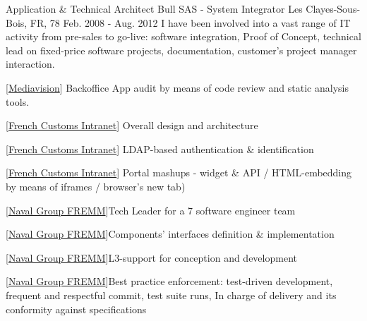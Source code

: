 \begin{cventries}
  \cventry
    {Application \& Technical Architect} %
    {Bull SAS - System Integrator} %
    {Les Clayes-Sous-Bois, FR, 78} %
    {Feb. 2008 - Aug. 2012} %
{
I have been involved into a vast range of IT activity from pre-sales to go-live: software integration, Proof of Concept, technical lead on fixed-price software projects, documentation, customer’s project manager interaction.
} %
{
      \begin{cvitems} %
        \item {[\href{http://www.mediavision.fr}{Mediavision}] Backoffice App audit by means of code review and static analysis tools.}
        \item {[\href{http://www.douane.gouv.fr/articles/a13408-travel-coming-to-france-with-your-pet}{French Customs Intranet}] Overall design and architecture}
        \item {[\href{http://www.douane.gouv.fr/articles/a13408-travel-coming-to-france-with-your-pet}{French Customs Intranet}] LDAP-based authentication \& identification}
        \item {[\href{http://www.douane.gouv.fr/articles/a13408-travel-coming-to-france-with-your-pet}{French Customs Intranet}] Portal mashups - widget \& API / HTML-embedding by means of iframes / browser's new tab)}
        \item {[\href{https://www.naval-group.com/en/news/dcns-delivers-multi-mission-frigate-auvergne-the-fourth-fremm-for-the-french-navy/}{Naval Group FREMM}]Tech Leader for a 7 software engineer team}
        \item {[\href{https://www.naval-group.com/en/news/dcns-delivers-multi-mission-frigate-auvergne-the-fourth-fremm-for-the-french-navy/}{Naval Group FREMM}]Components’ interfaces definition \& implementation} 
        \item {[\href{https://www.naval-group.com/en/news/dcns-delivers-multi-mission-frigate-auvergne-the-fourth-fremm-for-the-french-navy/}{Naval Group FREMM}]L3-support for conception and development}
        \item {[\href{https://www.naval-group.com/en/news/dcns-delivers-multi-mission-frigate-auvergne-the-fourth-fremm-for-the-french-navy/}{Naval Group FREMM}]Best practice enforcement: test-driven development, frequent and respectful commit, test suite runs, In charge of delivery and its conformity against specifications}
      \end{cvitems}
} %


\end{cventries}
